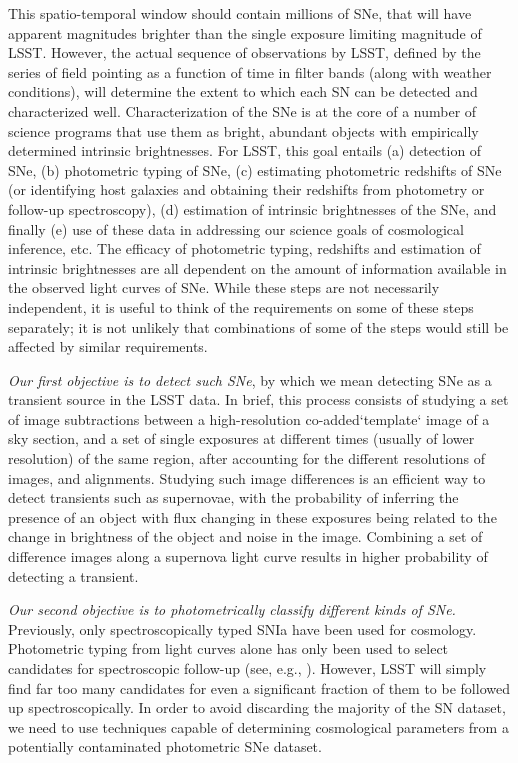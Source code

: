 This spatio-temporal window should contain millions
of SNe, that will have apparent magnitudes brighter than the single
exposure limiting magnitude of LSST.  However, the actual sequence of
observations by LSST, defined by the series of field pointing as a
function of time in filter bands (along with weather conditions), will
determine the extent to which each SN can be detected and characterized
well.  Characterization of the SNe is at the core of a number of science
programs that use them as bright, abundant objects with empirically
determined intrinsic brightnesses. For LSST, this goal entails (a)
detection of SNe, (b) photometric typing of SNe, (c) estimating photometric
redshifts of SNe (or identifying host galaxies and obtaining their
redshifts from photometry or follow-up spectroscopy), (d) estimation of
intrinsic brightnesses of the SNe, and finally (e) use of these data in
addressing our science goals of cosmological inference, etc. The efficacy
of photometric typing, redshifts and estimation of intrinsic brightnesses
are all dependent on the amount of information available in the observed
light curves of SNe. While these steps are not necessarily independent, it
is useful to think of the requirements on some of these steps separately;
it is not unlikely  that combinations of some of the steps would still be
affected by similar requirements.

{\emph{Our first objective is to detect such SNe}}, by which we mean
detecting SNe as a transient source in the LSST data. 
In brief, this process consists of studying a set of image subtractions
between a high-resolution co-added`template` image of a sky section, and a set of
single exposures at different times (usually of lower resolution) of the
same region, after accounting for the different resolutions of images, and
alignments. Studying such image differences is an efficient way to detect
 transients such as supernovae, with the probability of inferring the presence
 of an object with flux changing in these exposures being related to the change in 
 brightness of the object and noise in the image. Combining a set of difference images 
 along a supernova light curve results in higher probability of detecting a transient. 


{\emph{Our second objective is to photometrically classify different kinds of SNe.}}
Previously, only spectroscopically typed SNIa have been used for cosmology. Photometric
typing from light curves alone has only been used to select candidates for spectroscopic
follow-up (see, e.g., \citet{Sako2008}). However, LSST will simply find far too many
candidates for even a significant fraction of them to be followed up spectroscopically. In order to avoid
discarding the majority of the SN dataset, we need to use techniques capable of
determining cosmological parameters from a potentially contaminated photometric SNe dataset.

